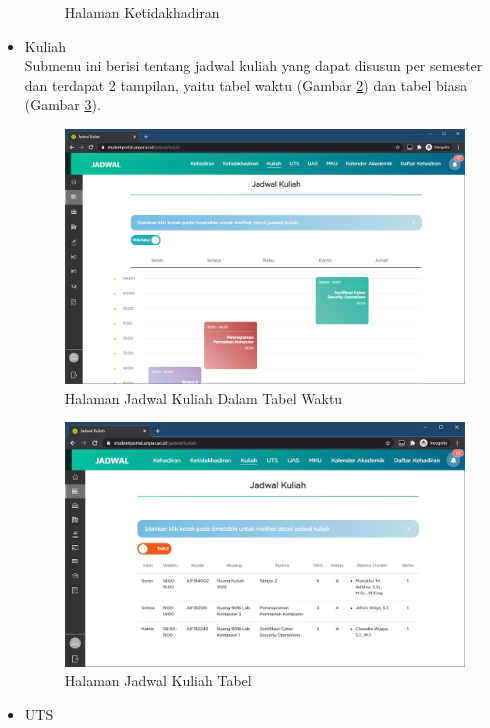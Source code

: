 \begin{itemize}
\begin{figure}[H]
    			\caption{Halaman Ketidakhadiran}
    			\label{fig:3_ketidakhadiran}
			\end{figure}
			\item Kuliah \\
			Submenu ini berisi tentang jadwal kuliah yang dapat disusun per semester dan terdapat 2 tampilan, yaitu tabel waktu (Gambar \ref{fig:3_jadwal_kuliah}) dan tabel biasa (Gambar \ref{fig:3_jadwal_kuliah_table}).
			\begin{figure}[H]
    			\centering
    			\includegraphics[scale=0.45]{Gambar/jadwal_kuliah.png}
    			\caption{Halaman Jadwal Kuliah Dalam Tabel Waktu}
    			\label{fig:3_jadwal_kuliah}
			\end{figure}
			\begin{figure}[H]
    			\centering
    			\includegraphics[scale=0.45]{Gambar/jadwal_kuliah_table.png}
    			\caption{Halaman Jadwal Kuliah Tabel}
    			\label{fig:3_jadwal_kuliah_table}
			\end{figure}
			\item UTS \\

\end{itemize}
